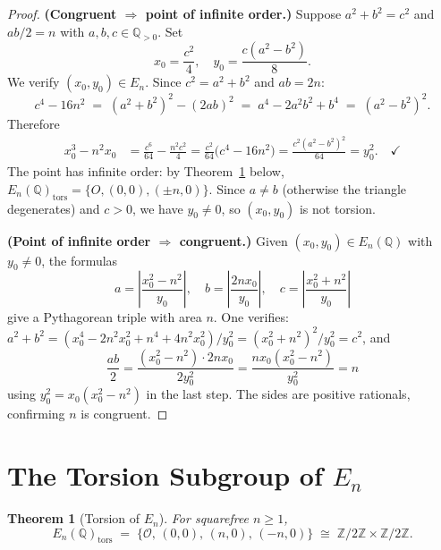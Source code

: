 \documentclass[12pt,a4paper]{amsart}
\newtheorem{theorem}{Theorem}[section]
\theoremstyle{definition}
\newcommand{\Z}{\mathbb{Z}}
\newcommand{\Q}{\mathbb{Q}}
\begin{document}
\begin{proof}
\textbf{(Congruent $\Rightarrow$ point of infinite order.)}
Suppose $a^2 + b^2 = c^2$ and $ab/2 = n$ with $a,b,c \in \Q_{>0}$.
Set
\[
  x_0 = \frac{c^2}{4}, \quad y_0 = \frac{c(a^2 - b^2)}{8}.
\]
We verify $(x_0, y_0) \in E_n$.  Since $c^2 = a^2 + b^2$ and $ab = 2n$:
\[
  c^4 - 16n^2 \;=\; (a^2+b^2)^2 - (2ab)^2
  \;=\; a^4 - 2a^2b^2 + b^4 \;=\; (a^2-b^2)^2.
\]
Therefore
\begin{align*}
  x_0^3 - n^2 x_0
  &= \frac{c^6}{64} - \frac{n^2 c^2}{4}
   = \frac{c^2}{64}\bigl(c^4 - 16n^2\bigr)
   = \frac{c^2(a^2-b^2)^2}{64}
   = y_0^2. \quad \checkmark
\end{align*}
The point has infinite order: by Theorem~\ref{thm:torsion_En} below,
$E_n(\Q)_{\mathrm{tors}} = \{O,(0,0),(\pm n, 0)\}$.
Since $a \ne b$ (otherwise the triangle degenerates) and $c > 0$, we have
$y_0 \ne 0$, so $(x_0,y_0)$ is not torsion.

\textbf{(Point of infinite order $\Rightarrow$ congruent.)}
Given $(x_0, y_0) \in E_n(\Q)$ with $y_0 \ne 0$, the formulas
\[
  a = \left|\frac{x_0^2 - n^2}{y_0}\right|, \quad
  b = \left|\frac{2nx_0}{y_0}\right|, \quad
  c = \left|\frac{x_0^2 + n^2}{y_0}\right|
\]
give a Pythagorean triple with area $n$.
One verifies: $a^2 + b^2 = (x_0^4 - 2n^2 x_0^2 + n^4 + 4n^2 x_0^2)/y_0^2
= (x_0^2 + n^2)^2/y_0^2 = c^2$, and
\[
  \frac{ab}{2} = \frac{(x_0^2-n^2) \cdot 2nx_0}{2y_0^2}
  = \frac{nx_0(x_0^2-n^2)}{y_0^2} = n
\]
using $y_0^2 = x_0(x_0^2-n^2)$ in the last step.
The sides are positive rationals, confirming $n$ is congruent.
\end{proof}

\section{The Torsion Subgroup of \texorpdfstring{$E_n$}{En}}

\begin{theorem}[Torsion of $E_n$]
\label{thm:torsion_En}
For squarefree $n \ge 1$,
\[
  E_n(\Q)_{\mathrm{tors}} \;=\; \{\mathcal{O},\, (0,0),\, (n,0),\, (-n,0)\}
  \;\cong\; \Z/2\Z \times \Z/2\Z.
\]
\end{theorem}
\end{document}
